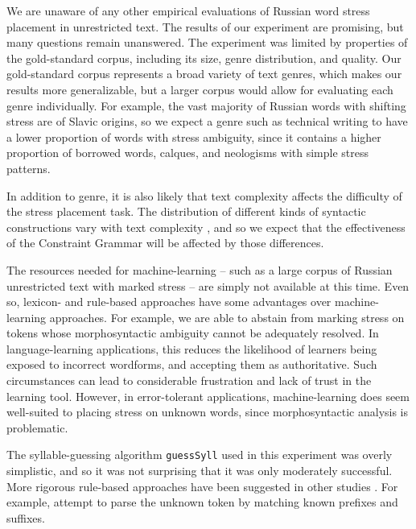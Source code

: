 \documentclass[11pt]{article}
\newcommand{\lj}[1]{\marginpar{\scriptsize L: #1}} %
\begin{document}
We are unaware of any other empirical evaluations of Russian word stress placement 
in unrestricted text. The results of our experiment are promising, but many 
questions remain unanswered.
The experiment was limited by properties of the gold-standard corpus, including
its size, genre distribution, and quality.
Our gold-standard corpus represents a broad variety of text genres, which 
makes our results more generalizable, but a larger corpus would allow for
evaluating each genre individually. For example, the vast majority of Russian
words with shifting stress are of Slavic origins, so we expect a genre such as 
technical writing to have a lower proportion of words with stress ambiguity, 
since it contains a higher proportion of borrowed words, calques, and neologisms 
with simple stress patterns.

In addition to genre, it is also likely that text
complexity affects the difficulty of the stress placement task. The distribution
of different kinds of syntactic constructions vary with text complexity 
\cite{Vajjala.Meurers-12}, and so we expect that the effectiveness of the 
Constraint Grammar will be affected by those differences.

The resources needed for machine-learning -- such as a large corpus of Russian 
unrestricted text with marked stress -- are simply
not available at this time. Even so, lexicon- and rule-based approaches have
some advantages over machine-learning approaches. For example, we are able to
abstain from marking stress on tokens whose morphosyntactic ambiguity cannot be
adequately resolved. In language-learning applications, this reduces the 
likelihood of learners being exposed to incorrect wordforms, and accepting them
as authoritative. Such circumstances can lead to considerable frustration and
lack of trust in the learning tool. However, in error-tolerant applications, 
machine-learning does seem well-suited to placing stress on unknown words, since 
morphosyntactic analysis is problematic.

The syllable-guessing algorithm {\small {\tt guessSyll}} used in this 
experiment was overly simplistic, and so it was not surprising that it was only 
moderately successful. More rigorous rule-based approaches have been suggested in 
other studies \cite{Church-85,Williams-87,Xomicevic.Rybin.ea-08}. For example, 
 attempt to parse the unknown token by matching known 
prefixes and suffixes.
\end{document}
